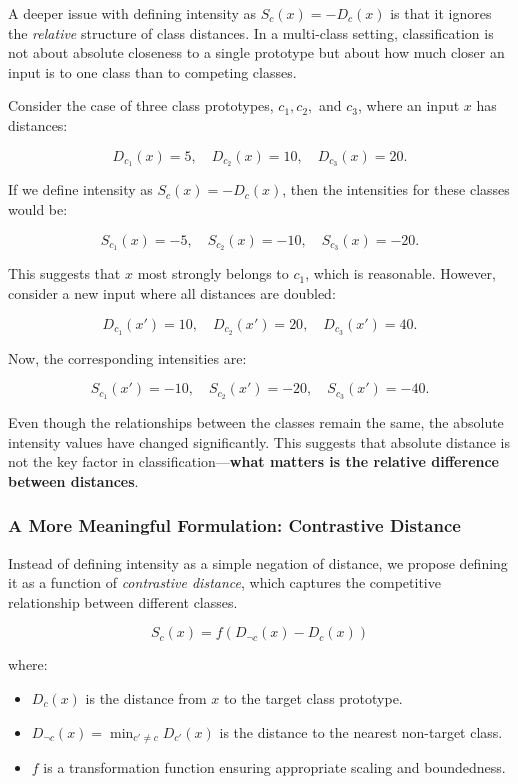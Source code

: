 A deeper issue with defining intensity as \( S_c(x) = -D_c(x) \) is that it ignores the \textit{relative} structure of class distances. In a multi-class setting, classification is not about absolute closeness to a single prototype but about how much closer an input is to one class than to competing classes.

Consider the case of three class prototypes, \( c_1, c_2, \) and \( c_3 \), where an input \( x \) has distances:

\[
D_{c_1}(x) = 5, \quad D_{c_2}(x) = 10, \quad D_{c_3}(x) = 20.
\]

If we define intensity as \( S_c(x) = -D_c(x) \), then the intensities for these classes would be:

\[
S_{c_1}(x) = -5, \quad S_{c_2}(x) = -10, \quad S_{c_3}(x) = -20.
\]

This suggests that \( x \) most strongly belongs to \( c_1 \), which is reasonable. However, consider a new input where all distances are doubled:

\[
D_{c_1}(x') = 10, \quad D_{c_2}(x') = 20, \quad D_{c_3}(x') = 40.
\]

Now, the corresponding intensities are:

\[
S_{c_1}(x') = -10, \quad S_{c_2}(x') = -20, \quad S_{c_3}(x') = -40.
\]

Even though the relationships between the classes remain the same, the absolute intensity values have changed significantly. This suggests that absolute distance is not the key factor in classification—\textbf{what matters is the relative difference between distances}.


\subsubsection{A More Meaningful Formulation: Contrastive Distance}

Instead of defining intensity as a simple negation of distance, we propose defining it as a function of \textit{contrastive distance}, which captures the competitive relationship between different classes.

\[
S_c(x) = f(D_{\neg c}(x) - D_c(x))
\]

where:

\begin{itemize}
    \item \( D_c(x) \) is the distance from \( x \) to the target class prototype.
    \item \( D_{\neg c}(x) = \min_{c' \neq c} D_{c'}(x) \) is the distance to the nearest non-target class.
    \item \( f \) is a transformation function ensuring appropriate scaling and boundedness.
\end{itemize}

